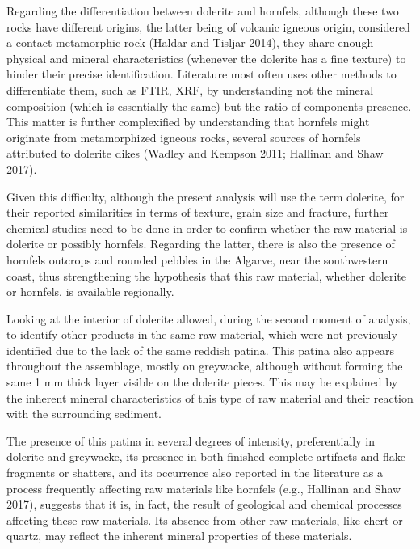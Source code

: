 \documentclass[12pt,twoside]{reedthesis}
\begin{document}
Regarding the differentiation between dolerite and hornfels, although these two rocks have different origins, the latter being of volcanic igneous origin, considered a contact metamorphic rock (Haldar and Tisljar 2014), they share enough physical and mineral characteristics (whenever the dolerite has a fine texture) to hinder their precise identification. Literature most often uses other methods to differentiate them, such as FTIR, XRF, by understanding not the mineral composition (which is essentially the same) but the ratio of components presence. This matter is further complexified by understanding that hornfels might originate from metamorphized igneous rocks, several sources of hornfels attributed to dolerite dikes (Wadley and Kempson 2011; Hallinan and Shaw 2017).

Given this difficulty, although the present analysis will use the term dolerite, for their reported similarities in terms of texture, grain size and fracture, further chemical studies need to be done in order to confirm whether the raw material is dolerite or possibly hornfels. Regarding the latter, there is also the presence of hornfels outcrops and rounded pebbles in the Algarve, near the southwestern coast, thus strengthening the hypothesis that this raw material, whether dolerite or hornfels, is available regionally.

Looking at the interior of dolerite allowed, during the second moment of analysis, to identify other products in the same raw material, which were not previously identified due to the lack of the same reddish patina. This patina also appears throughout the assemblage, mostly on greywacke, although without forming the same 1 mm thick layer visible on the dolerite pieces. This may be explained by the inherent mineral characteristics of this type of raw material and their reaction with the surrounding sediment.

The presence of this patina in several degrees of intensity, preferentially in dolerite and greywacke, its presence in both finished complete artifacts and flake fragments or shatters, and its occurrence also reported in the literature as a process frequently affecting raw materials like hornfels (e.g., Hallinan and Shaw 2017), suggests that it is, in fact, the result of geological and chemical processes affecting these raw materials. Its absence from other raw materials, like chert or quartz, may reflect the inherent mineral properties of these materials.
\end{document}
